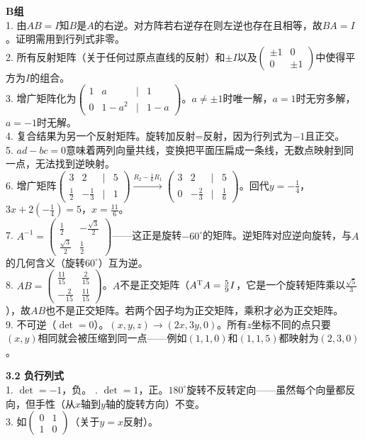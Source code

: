 \noindent\textbf{B组}\\
1. 由$AB=I$知$B$是$A$的右逆。对方阵若右逆存在则左逆也存在且相等，故$BA=I$。证明需用到行列式非零。\\
2. 所有反射矩阵（关于任何过原点直线的反射）和$\pm I$以及$\begin{pmatrix}\pm1&0\\0&\pm1\end{pmatrix}$中使得平方为$I$的组合。\\
3. 增广矩阵化为$\begin{pmatrix}1&a&|&1\\0&1-a^2&|&1-a\end{pmatrix}$。$a\neq\pm1$时唯一解，$a=1$时无穷多解，$a=-1$时无解。\\
4. 复合结果为另一个反射矩阵。旋转加反射=反射，因为行列式为$-1$且正交。\\
5. $ad-bc=0$意味着两列向量共线，变换把平面压扁成一条线，无数点映射到同一点，无法找到逆映射。\\
6. 增广矩阵$\begin{pmatrix}3&2&|&5\\\frac12&-\frac13&|&1\end{pmatrix}\xrightarrow{R_2- \frac16 R_1}\begin{pmatrix}3&2&|&5\\0&-\frac23&|&\frac16\end{pmatrix}$。回代$y=-\frac14$，$3x+2(-\frac14)=5$，$x=\frac{11}{6}$。\\
7. $A^{-1}=\begin{pmatrix}\frac12&-\frac{\sqrt3}{2}\\\frac{\sqrt3}{2}&\frac12\end{pmatrix}$——这正是旋转$-60^\circ$的矩阵。逆矩阵对应逆向旋转，与$A$的几何含义（旋转$60^\circ$）互为逆。\\
8. $AB=\begin{pmatrix}\frac{11}{15}&\frac{2}{15}\\-\frac{2}{15}&\frac{11}{15}\end{pmatrix}$。$A$不是正交矩阵（$A^{\text T}A=\frac59 I$，它是一个旋转矩阵乘以$\frac{\sqrt5}{3}$），故$AB$也不是正交矩阵。若两个因子均为正交矩阵，乘积才必为正交矩阵。\\
9. 不可逆（$\det=0$）。$(x,y,z)\to(2x,3y,0)$。所有$z$坐标不同的点只要$(x,y)$相同就会被压缩到同一点——例如$(1,1,0)$和$(1,1,5)$都映射为$(2,3,0)$。


\noindent\textbf{3.2 负行列式}\\
1. $\det=-1$，负。 . $\det=1$，正。$180^\circ$旋转不反转定向——虽然每个向量都反向，但手性（从$x$轴到$y$轴的旋转方向）不变。\\
3. 如$\begin{pmatrix}0&1\\1&0\end{pmatrix}$（关于$y=x$反射）。

